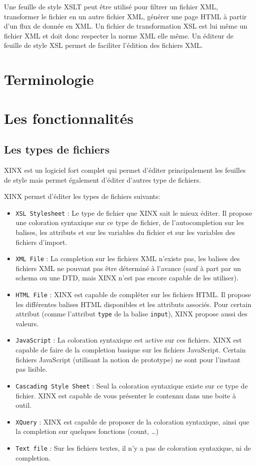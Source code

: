 \documentclass[a4paper,10pt,twoside]{book}
\begin{document}
Une feuille de style XSLT peut être utilisé pour filtrer un fichier XML, transformer le fichier en un autre fichier XML, générer une page HTML à partir d'un flux de donnée en XML. Un fichier de transformation XSL est lui même un fichier XML et doit donc respecter la norme XML elle même. Un éditeur de feuille de style XSL permet de faciliter l'édition des fichiers XML.

\section{Terminologie}

\section{Les fonctionnalités}

\subsection{Les types de fichiers}

XINX est un logiciel fort complet qui permet d'éditer principalement les feuilles de style mais permet également d'éditer d'autres type de fichiers.

XINX permet d'éditer les types de fichiers suivants:
\begin{itemize}
  \item \verb+XSL Stylesheet+ : Le type de fichier que XINX sait le mieux éditer. Il propose une coloration syntaxique sur ce type de fichier, de l'autocompletion sur les balises, les attributs et sur les variables du fichier et sur les variables des fichiers d'import.
  \item \verb+XML File+ : La completion sur les fichiers XML n'existe pas, les balises des fichiers XML ne pouvant pas être déterminé à l'avance (sauf à part par un schema ou une DTD, mais XINX n'est pas encore capable de les utiliser). 
  \item \verb+HTML File+ : XINX est capable de compléter sur les fichiers HTML. Il propose les différentes balises HTML disponibles et les attributs associés. Pour certain attribut (comme l'attribut \verb+type+ de la balise \verb+input+), XINX propose aussi des valeurs.
  \item \verb+JavaScript+ : La coloration syntaxique est active sur ces fichiers. XINX est capable de faire de la completion basique sur les fichiers JavaScript. Certain fichiers JavaScript (utilisant la notion de prototype) ne sont pour l'instant pas lisible.
  \item \verb+Cascading Style Sheet+ : Seul la coloration syntaxique existe sur ce type de fichier. XINX est capable de vous présenter le contennu dans une boite à outil.
  \item \verb+XQuery+ : XINX est capable de proposer de la coloration syntaxique, ainsi que la completion sur quelques fonctions (count, \dots)
  \item \verb+Text file+ : Sur les fichiers textes, il n'y a pas de coloration syntaxique, ni de completion.
\end{itemize}
\end{document}
